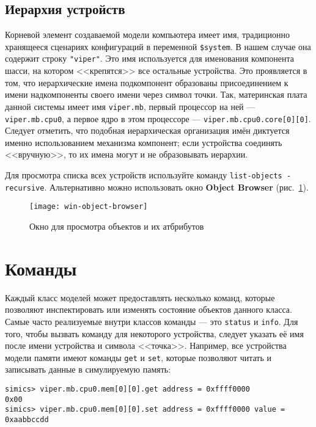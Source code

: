 \subsection{Иерархия устройств}

Корневой элемент создаваемой модели компьютера имеет имя, традиционно хранящееся сценариях конфигураций в переменной \texttt{\$system}. В нашем случае она содержит строку \texttt{"viper"}. Это имя используется для именования компонента шасси, на котором <<крепятся>> все остальные устройства. Это проявляется в том, что иерархические имена подкомпонент образованы присоединением к имени надкомпоненты своего имени через символ точки. Так, материнская плата данной системы имеет имя \texttt{viper.mb}, первый процессор на ней --- \texttt{viper.mb.cpu0}, а первое ядро в этом процессоре --- \texttt{viper.mb.cpu0.core[0][0]}. Следует отметить, что подобная иерархическая организация имён диктуется именно использованием механизма компонент; если устройства соединять <<вручную>>, то их имена могут и не образовывать иерархии.

Для просмотра списка всех устройств используйте команду \texttt{list-objects -recursive}. Альтернативно можно использовать окно \textbf{Object Browser} (рис.~\ref{fig:object-browser}).

\begin{figure}[htb]
    \centering
    \texttt{[image: win-object-browser]}
    \caption{Окно для просмотра объектов и их атбрибутов}
    \label{fig:object-browser}
\end{figure}

\section{Команды}

Каждый класс моделей может предоставлять несколько команд, которые позволяют инспектировать или изменять состояние объектов данного класса. Самые часто реализуемые внутри классов команды --- это \texttt{status} и \texttt{info}. Для того, чтобы вызвать команду для некоторого устройства, следует указать её имя после имени устройства и символа <<точка>>.
Например, все устройства модели памяти имеют команды \texttt{get} и \texttt{set}, которые позволяют читать и записывать данные в симулируемую память:

\begin{lstlisting}
simics> viper.mb.cpu0.mem[0][0].get address = 0xffff0000
0x00
simics> viper.mb.cpu0.mem[0][0].set address = 0xffff0000 value = 0xaabbccdd
\end{lstlisting}

